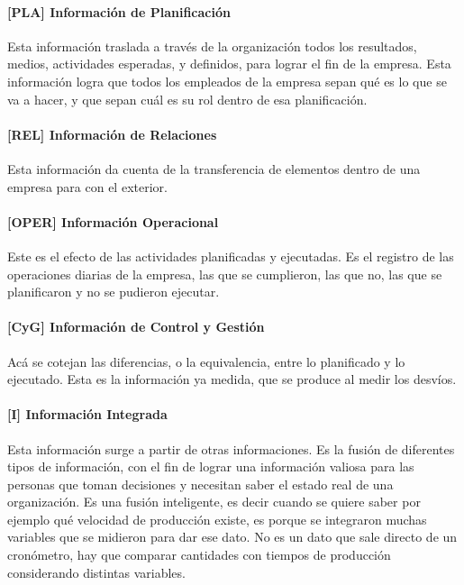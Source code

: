 \hypertarget{informaciuxf3n-de-planificaciuxf3n}{%
\paragraph{[PLA] Información de
Planificación}\label{informaciuxf3n-de-planificaciuxf3n}}
Esta información traslada a través de la organización todos los
resultados, medios, actividades esperadas, y definidos, para lograr el
fin de la empresa. Esta información logra que todos los empleados de la
empresa sepan qué es lo que se va a hacer, y que sepan cuál es su rol
dentro de esa planificación.

\hypertarget{informaciuxf3n-de-relaciones}{%
\paragraph{[REL] Información de
Relaciones}\label{informaciuxf3n-de-relaciones}}
Esta información da cuenta de la transferencia de elementos dentro de
una empresa para con el exterior.

\hypertarget{informacion-operacional}{%
\paragraph{[OPER] Información Operacional}\label{informacion-operacional}}
Este es el efecto de las actividades planificadas y ejecutadas. Es el
registro de las operaciones diarias de la empresa, las que se
cumplieron, las que no, las que se planificaron y no se pudieron
ejecutar.

\hypertarget{informaciuxf3n-de-control-y-gestiuxf3n}{%
\paragraph{[CyG] Información de Control y
Gestión}\label{informaciuxf3n-de-control-y-gestiuxf3n}}
Acá se cotejan las diferencias, o la equivalencia, entre lo planificado
y lo ejecutado. Esta es la información ya medida, que se produce al
medir los desvíos.

\hypertarget{informaciuxf3n-integrada}{%
\paragraph{[I] Información Integrada}\label{informaciuxf3n-integrada}}
Esta información surge a partir de otras informaciones. Es la fusión de
diferentes tipos de información, con el fin de lograr una información
valiosa para las personas que toman decisiones y necesitan saber el
estado real de una organización. Es una fusión inteligente, es decir
cuando se quiere saber por ejemplo qué velocidad de producción existe,
es porque se integraron muchas variables que se midieron para dar ese
dato. No es un dato que sale directo de un cronómetro, hay que comparar
cantidades con tiempos de producción considerando distintas variables.

